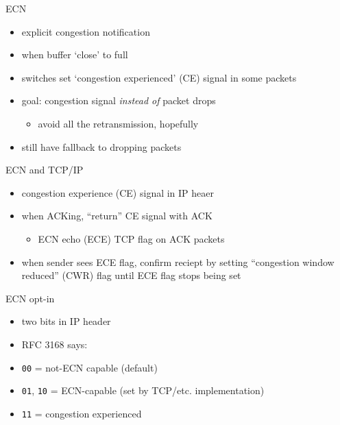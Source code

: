 \usetikzlibrary{arrows.meta}
\begin{frame}{ECN}
\begin{itemize}
\item explicit congestion notification
\vspace{.5cm}
\item when buffer `close' to full
\item switches set `congestion experienced' (CE) signal in some packets
\item goal: congestion signal \textit{instead of} packet drops
    \begin{itemize}
    \item avoid all the retransmission, hopefully
    \end{itemize}
\vspace{.5cm}
\item still have fallback to dropping packets
\end{itemize}
\end{frame}

\begin{frame}{ECN and TCP/IP}
\begin{itemize}
\item congestion experience (CE) signal in IP heaer
\item when ACKing, ``return'' CE signal with ACK
    \begin{itemize}
    \item ECN echo (ECE) TCP flag on ACK packets
    \end{itemize}
\vspace{.25cm}
\item when sender sees ECE flag, confirm reciept by setting
    ``congestion window reduced'' (CWR) flag until ECE flag stops being set
\end{itemize}
\end{frame}

\begin{frame}{ECN opt-in}
    \begin{itemize}
    \item two bits in IP header
    \item RFC 3168 says:
    \vspace{.5cm}
    \item \texttt{00} = not-ECN capable (default)
    \item \texttt{01}, \texttt{10} = ECN-capable (set by TCP/etc. implementation)
    \item \texttt{11} = congestion experienced
    \end{itemize}
\end{frame}

